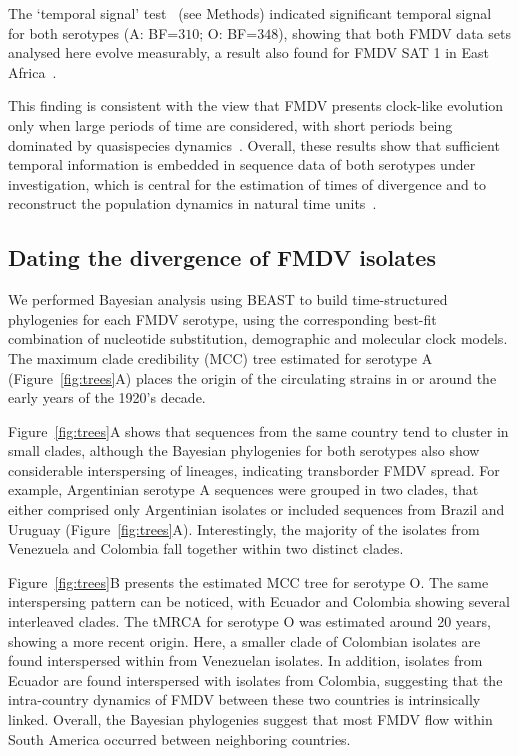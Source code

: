 \documentclass[10pt]{article}
\begin{document}
The  `temporal signal' test~\cite{Faria2012} (see Methods) indicated significant temporal signal for both serotypes (A: BF=$310$; O: BF=$348$), showing that both FMDV data sets analysed here evolve measurably, a result also found for FMDV SAT 1 in East Africa~\cite{sangula}.

This finding is consistent with the view that FMDV presents clock-like evolution only when large periods of time are considered, with short periods being dominated by quasispecies dynamics~\cite{Muellner2011}.
Overall, these results show that sufficient temporal information is embedded in sequence data of both serotypes under investigation, which is central for the estimation of times of divergence and to reconstruct the population dynamics in natural time units~\cite{MEP}.

\subsection*{Dating the divergence of FMDV isolates}

We performed Bayesian analysis using BEAST to build time-structured phylogenies for each FMDV serotype, using the corresponding best-fit combination of nucleotide substitution, demographic and molecular clock models.
The maximum clade credibility (MCC) tree estimated for serotype A (Figure~\ref{fig:trees}A) places the origin of the circulating strains in or around the early years of the 1920's decade.

Figure~\ref{fig:trees}A shows that sequences from the same country tend to cluster in small clades, although the Bayesian phylogenies for both serotypes also show considerable interspersing of lineages, indicating transborder FMDV spread.
For example, Argentinian serotype A sequences were grouped in two clades, that either comprised only Argentinian isolates or included sequences from Brazil and Uruguay (Figure~\ref{fig:trees}A).
Interestingly, the majority of the isolates from Venezuela and Colombia fall together within two distinct clades. 

Figure~\ref{fig:trees}B presents the estimated MCC tree for serotype O.
The same interspersing pattern can be noticed, with Ecuador and Colombia showing several interleaved clades.
The tMRCA for serotype O was estimated around 20 years, showing a more recent origin.
Here, a smaller clade of Colombian isolates are found interspersed within from Venezuelan isolates.
In addition, isolates from Ecuador are found interspersed with isolates from Colombia, suggesting that the intra-country dynamics of FMDV between these two countries is intrinsically linked.
Overall, the Bayesian phylogenies suggest that most FMDV flow within South America occurred between neighboring countries. 
\end{document}
